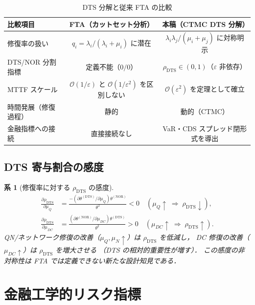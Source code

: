 \documentclass[12pt,a4paper]{article}
\theoremstyle{plain}
\newtheorem{corollary}[theorem]{系}
\theoremstyle{definition}
\theoremstyle{remark}
\newcommand{\calO}{\mathcal{O}}
\newcommand{\eps}{\varepsilon}
\newcommand{\thetaNOR}{\theta^{(\mathrm{NOR})}}
\newcommand{\thetaDTS}{\theta^{(\mathrm{DTS})}}
\newcommand{\rhoDTS}{\rho_{\mathrm{DTS}}}
\begin{document}
\begin{table}[H]
  \centering
  \caption{DTS 分解と従来 FTA の比較}
  \label{tab:FTA_compare}
  \begin{tabular}{lcc}
    \toprule
    比較項目 & FTA（カットセット分析） & 本稿（CTMC DTS 分解） \\
    \midrule
    修復率の扱い & $q_i = \lambda_i/(\lambda_i+\mu_i)$ に潜在 & $\lambda_i\lambda_j/(\mu_i+\mu_j)$ に対称明示 \\
    DTS/NOR 分割指標 & 定義不能（$0/0$）& $\rhoDTS\in(0,1)$（$\eps$ 非依存） \\
    MTTF スケール & $\calO(1/\eps)$ と $\calO(1/\eps^2)$ を区別しない & $\calO(\eps^2)$ を定理として確立 \\
    時間発展（修復過程） & 静的 & 動的（CTMC）\\
    金融指標への接続 & 直接接続なし & VaR・CDS スプレッド閉形式を導出 \\
    \bottomrule
  \end{tabular}
\end{table}

\subsection{DTS 寄与割合の感度}

\begin{corollary}[修復率に対する $\rhoDTS$ の感度]\label{cor:rho_sens}
  \begin{align}
    \frac{\partial\rhoDTS}{\partial\mu_Q}
    &= \frac{-(\partial\thetaDTS/\partial\mu_Q)\thetaNOR}{\theta^2}
     < 0 \quad(\mu_Q \uparrow \;\Rightarrow\; \rhoDTS \downarrow),\\
    \frac{\partial\rhoDTS}{\partial\mu_{DC}}
    &= \frac{(\partial\thetaNOR/\partial\mu_{DC})\thetaDTS}{\theta^2}
     > 0 \quad(\mu_{DC} \uparrow \;\Rightarrow\; \rhoDTS \uparrow).
  \end{align}
  QN/ネットワーク修復の改善（$\mu_Q,\mu_{N}\uparrow$）は $\rhoDTS$ を低減し，
  DC 修復の改善（$\mu_{DC}\uparrow$）は $\rhoDTS$ を増大させる
  （DTS の相対的重要性が増す）．
  この感度の非対称性は FTA では定義できない新たな設計知見である．
\end{corollary}

\section{金融工学的リスク指標}\label{sec:risk}
\end{document}
